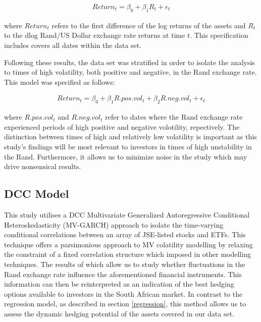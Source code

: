 \documentclass[11pt,preprint, authoryear]{elsarticle}
\numberwithin{equation}{section}
\numberwithin{figure}{section}
\numberwithin{table}{section}
\begin{document}
\begin{align} 
Return_t = \beta_0 + \beta_1 R_t + \epsilon_t \label{eq1}
\end{align}

where \(Return_t\) refers to the first difference of the log returns of
the assets and \(R_t\) to the dlog Rand/US Dollar exchange rate returns
at time \(t\). This specification includes covers all dates within the
data set.

Following these results, the data set was stratified in order to isolate
the analysis to times of high volatility, both positive and negative, in
the Rand exchange rate. This model was specified as follows:

\begin{align} 
Return_t = \beta_0 + \beta_1 R.pos.vol_t + \beta_2 R.neg.vol_t + \epsilon_t \label{eq2}
\end{align}

where \(R.pos.vol_t\) and \(R.neg.vol_t\) refer to dates where the Rand
exchange rate experienced periods of high positive and negative
volotility, repectively. The distinction between times of high and
relatively low volatility is important as this study's findings will be
most relevant to investors in times of high unstability in the Rand.
Furthermore, it allows us to minimize noise in the study which may drive
nonsensical results.

\pagebreak

\subsection{DCC Model}\label{dcc-model}

This study utilises a DCC Multivariate Generalized Autoregressive
Conditional Heteroskedasticity (MV-GARCH) approach to isolate the
time-varying conditional correlations between an array of JSE-listed
stocks and ETFs. This technique offers a parsimonious approach to MV
colatility modelling by relaxing the constraint of a fixed correlation
structure which imposed in other modelling techniques. The results of
which allow us to study whether fluctuations in the Rand exchange rate
influence the aforementioned financial instruments. This information can
then be reinterpreted as an indication of the best hedging options
available to investors in the South African market. In contrast to the
regression model, as described in section \ref{regression}, this method
allows us to assess the dynamic hedging potential of the assets covered
in our data set.
\end{document}
